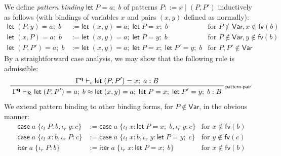 \documentclass[acmsmall,screen,anonymous,review]{acmart}
\newcommand{\mc}[1]{\ensuremath{\mathcal{#1}}}
\newcommand{\mb}[1]{\ensuremath{\mathbf{#1}}}
\newcommand{\ms}[1]{\ensuremath{\mathsf{#1}}}
\newcommand{\lto}{:}
\newcommand{\linl}[1]{\iota_l\;{#1}}
\newcommand{\linr}[1]{\iota_r\;{#1}}
\newcommand{\letexpr}[3]{\ensuremath{\ms{let}\;#1 = #2;\;#3}}
\newcommand{\caseexpr}[5]{\ms{case}\;#1\;\{\linl{#2} \lto #3, \linr{#4} \lto #5\}}
\newcommand{\liter}[3]{\ms{iter}\;#1\;\{ \linr{#2} \lto #3 \}}
\newcommand{\rle}[1]{{\scriptsize\textsf{#1}}}
\newcommand{\hasty}[4]{#1 \vdash_{#2} #3: {#4}}
\newcommand{\teqv}{\approx}
\newcommand{\tmeq}[5]{#1 \vdash_{#2} #3 \teqv #4 : {#5}}
\begin{document}
We define \emph{pattern binding} $\letexpr{P}{a}{b}$ of patterns $P ::= x \mid (P, P')$ inductively
as follows (with bindings of variables $x$ and pairs $(x, y)$ defined as normally):
\begin{align*}
  \letexpr{(P, y)}{a}{b} &:= \letexpr{(x, y)}{a}{\letexpr{P}{x}{b}} 
    & \text{for } P \notin \ms{Var}, x \notin \ms{fv}(b) \\
  \letexpr{(x, P)}{a}{b} &:= \letexpr{(x, y)}{a}{\letexpr{P}{y}{b}} 
    & \text{for } P \notin \ms{Var}, y \notin \ms{fv}(b) \\
  \letexpr{(P, P')}{a}{b} &:= \letexpr{(x, y)}{a}{\letexpr{P}{x}{\letexpr{P'}{y}{b}}} 
    & \text{for } P, P' \notin \ms{Var}
\end{align*}
By a straightforward case analysis, we may show that the following rule is admissible:
\begin{equation*}
  \prftree[r]{\rle{pattern-pair'}}
    {\hasty{\Gamma^{\mb{q}}}{\epsilon}{\letexpr{(P, P')}{x}{a}}{B}}
    {\tmeq{\Gamma^{\mb{q}}}
      {\mc{R}}{\letexpr{(P, P')}{a}{b}}
      {\letexpr{(x, y)}{a}{\letexpr{P}{x}{\letexpr{P'}{y}{b}}}}{B}}
\end{equation*}
We extend pattern binding to other binding forms, for $P \notin \ms{Var}$, in the obvious manner:
\begin{align*}
  \caseexpr{a}{P}{b}{y}{c} &:= \caseexpr{a}{x}{\letexpr{P}{x}{b}}{y}{c} 
  & \text{for } x \notin \ms{fv}(b) \\
  \caseexpr{a}{x}{b}{P}{c} &:= \caseexpr{a}{x}{b}{y}{\letexpr{P}{y}{c}} 
  & \text{for } y \notin \ms{fv}(c) \\
  \liter{a}{P}{b} &:= \liter{a}{x}{\letexpr{P}{x}{b}}
  & \text{for } x \notin \ms{fv}(b)
\end{align*}
\end{document}
